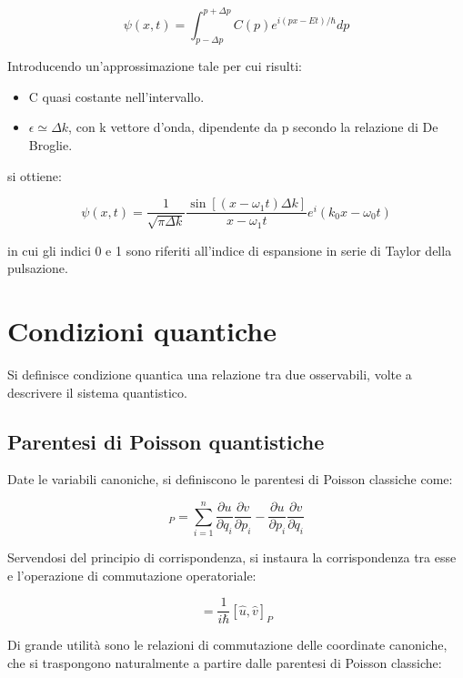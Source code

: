 \documentclass{article}
\begin{document}
\begin{equation}
    \psi(x,t)=\int_{p-\Delta p}^{p+\Delta p} C(p)e^{i(px-Et)/\hbar}dp
\end{equation}

Introducendo un'approssimazione tale per cui risulti:

\begin{itemize}
    \item C quasi costante nell'intervallo.
    \item $\epsilon \simeq \Delta k$, con k vettore d'onda, dipendente da p secondo la relazione di De Broglie.
\end{itemize}

si ottiene:

\begin{equation}
    \psi(x,t)= \frac{1}{\sqrt{\pi \Delta k}}\frac{\sin[(x-\omega_1 t)\Delta k]}{x-\omega_1 t}e^i(k_0x-\omega_0t)
\end{equation}

in cui gli indici 0 e 1 sono riferiti all'indice di espansione in serie di Taylor della pulsazione.

\section{Condizioni quantiche}
Si definisce condizione quantica una relazione tra due osservabili, volte a descrivere il sistema quantistico.

\subsection{Parentesi di Poisson quantistiche}
Date le variabili canoniche, si definiscono le parentesi di Poisson classiche come:

\begin{equation}
    [u,v]_P = \sum_{i=1}^{n} \frac{\partial u}{\partial q_i}\frac{\partial v}{\partial p_i} - \frac{\partial u}{\partial p_i}\frac{\partial v}{\partial q_i}
\end{equation}

Servendosi del principio di corrispondenza, si instaura la corrispondenza tra esse e l'operazione di commutazione operatoriale:

\begin{equation}
    [\hat{u},\hat{v}]= \frac{1}{i\hbar}[\hat{u},\hat{v}]_P
\end{equation}

Di grande utilità sono le relazioni di commutazione delle coordinate canoniche, che si traspongono naturalmente a partire
dalle parentesi di Poisson classiche:
\end{document}
